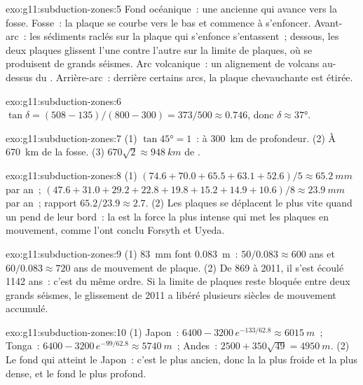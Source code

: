 \begin{solution}{exo:g11:subduction-zones:5}
Fond océanique~: une  ancienne qui avance vers la fosse. Fosse~:
la plaque se courbe vers le bas et commence à s'enfoncer. Avant-arc~: les
sédiments raclés sur la plaque qui s'enfonce s'entassent~; dessous, les deux
plaques glissent l'une contre l'autre sur la limite de plaques, où se
produisent de grands séismes. Arc volcanique~: un alignement de volcans
au-dessus du . Arrière-arc~: derrière certains arcs, la
plaque chevauchante est étirée.
\end{solution}

\begin{solution}{exo:g11:subduction-zones:6}
$\tan\delta = (508 - 135)/(800 - 300) = 373/500 \approx 0.746$, donc
$\delta \approx \ang{37}$.
\end{solution}

\begin{solution}{exo:g11:subduction-zones:7}
(1) $\tan\ang{45} = 1$~: à \qty{300}{km} de profondeur. (2) À \qty{670}{km}
de la fosse. (3) $670\sqrt{2} \approx \qty{948}{km}$ de .
\end{solution}

\begin{solution}{exo:g11:subduction-zones:8}
(1) $(74.6 + 70.0 + 65.5 + 63.1 + 52.6)/5 \approx \qty{65.2}{mm}$ par an~;
$(47.6 + 31.0 + 29.2 + 22.8 + 19.8 + 15.2 + 14.9 + 10.6)/8 \approx
\qty{23.9}{mm}$ par an~; rapport $65.2/23.9 \approx 2.7$. (2) Les plaques se
déplacent le plus vite quand un  pend de leur bord~: la
 est la force la plus intense qui met les
plaques en mouvement, comme l'ont conclu Forsyth et Uyeda.
\end{solution}

\begin{solution}{exo:g11:subduction-zones:9}
(1) \qty{83}{mm} font \qty{0.083}{m}~: $50/0.083 \approx 600$ ans et
$60/0.083 \approx 720$ ans de mouvement de plaque. (2) De 869 à 2011, il
s'est écoulé 1142 ans~: c'est du même ordre. Si la limite de plaques reste
bloquée entre deux grands séismes, le glissement de 2011 a libéré plusieurs
siècles de mouvement accumulé.
\end{solution}

\begin{solution}{exo:g11:subduction-zones:10}
(1) Japon~: $6400 - 3200\,e^{-133/62.8} \approx \qty{6015}{m}$~; Tonga~:
$6400 - 3200\,e^{-99/62.8} \approx \qty{5740}{m}$~; Andes~:
$2500 + 350\sqrt{49} = \qty{4950}{m}$. (2) Le fond qui atteint le Japon~:
c'est le plus ancien, donc la  la plus froide et la plus dense,
et le fond le plus profond.
\end{solution}

